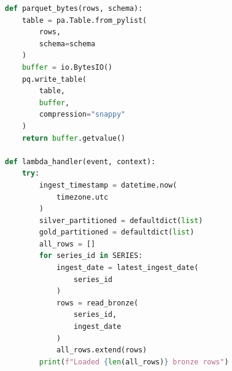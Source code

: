 \documentclass[11pt,a4paper]{article}
\begin{document}
\begin{lstlisting}[language=Python,
caption={Oil transformation},
label={lst:oil_transform_lambda}]
def parquet_bytes(rows, schema):
    table = pa.Table.from_pylist(
        rows,
        schema=schema
    )
    buffer = io.BytesIO()
    pq.write_table(
        table,
        buffer,
        compression="snappy"
    )
    return buffer.getvalue()

def lambda_handler(event, context):
    try:
        ingest_timestamp = datetime.now(
            timezone.utc
        )
        silver_partitioned = defaultdict(list)
        gold_partitioned = defaultdict(list)
        all_rows = []
        for series_id in SERIES:
            ingest_date = latest_ingest_date(
                series_id
            )
            rows = read_bronze(
                series_id,
                ingest_date
            )
            all_rows.extend(rows)
        print(f"Loaded {len(all_rows)} bronze rows")


\end{lstlisting}
\end{document}
